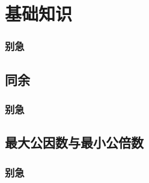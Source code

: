 
\section{基础知识}
\begin{frame} %
  \frametitle{别急}
\end{frame}
\subsection{同余}
\begin{frame}[c]
  \progressnow*
\end{frame}
\begin{frame} %
  \frametitle{别急}
\end{frame}
\subsection{最大公因数与最小公倍数}
\begin{frame}[c]
  \progressnow*
\end{frame}
\begin{frame} %
  \frametitle{别急}
\end{frame}
